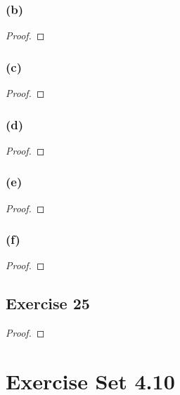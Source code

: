\documentclass[14pt]{extarticle}
\begin{document}
\subsubsection{(b)}

\begin{proof}

\end{proof}

\subsubsection{(c)}

\begin{proof}

\end{proof}

\subsubsection{(d)}

\begin{proof}

\end{proof}

\subsubsection{(e)}

\begin{proof}

\end{proof}

\subsubsection{(f)}

\begin{proof}

\end{proof}

\subsection{Exercise 25}

\begin{proof}

\end{proof}

\section{Exercise Set 4.10}
\end{document}

